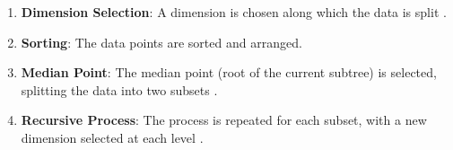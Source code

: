 \begin{enumerate}
    \item \textbf{Dimension Selection}: A dimension is chosen along which the data is split \cite{friedman1975algorithm}.
    \item \textbf{Sorting}: The data points are sorted and arranged.
    \item \textbf{Median Point}: The median point (root of the current subtree) is selected, splitting the data into two subsets \cite{friedman1975algorithm}.
    \item \textbf{Recursive Process}: The process is repeated for each subset, with a new dimension selected at each level \cite{friedman1975algorithm}.
\end{enumerate}

\vspace{5mm}

